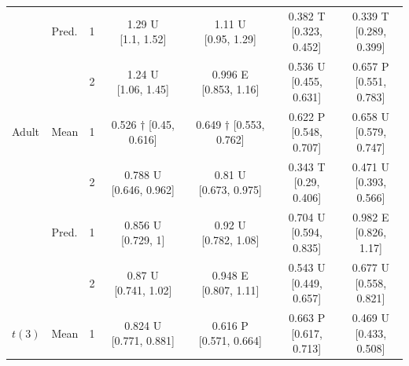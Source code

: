 \begin{tabular}{llccccc}
 & Pred. & 1 & \shortstack{1.29 U \\{} [1.1, 1.52]} & \shortstack{1.11 U \\{} [0.95, 1.29]} & \shortstack{0.382 T \\{} [0.323, 0.452]} & \shortstack{0.339 T \\{} [0.289, 0.399]} \\[2pt]
 &  & 2 & \shortstack{1.24 U \\{} [1.06, 1.45]} & \shortstack{0.996 E \\{} [0.853, 1.16]} & \shortstack{0.536 U \\{} [0.455, 0.631]} & \shortstack{0.657 P \\{} [0.551, 0.783]} \\[2pt]
\addlinespace
Adult & Mean & 1 & \shortstack{0.526 $\dagger$ \\{} [0.45, 0.616]} & \shortstack{0.649 $\dagger$ \\{} [0.553, 0.762]} & \shortstack{0.622 P \\{} [0.548, 0.707]} & \shortstack{0.658 U \\{} [0.579, 0.747]} \\[2pt]
 &  & 2 & \shortstack{0.788 U \\{} [0.646, 0.962]} & \shortstack{0.81 U \\{} [0.673, 0.975]} & \shortstack{0.343 T \\{} [0.29, 0.406]} & \shortstack{0.471 U \\{} [0.393, 0.566]} \\[2pt]
 & Pred. & 1 & \shortstack{0.856 U \\{} [0.729, 1]} & \shortstack{0.92 U \\{} [0.782, 1.08]} & \shortstack{0.704 U \\{} [0.594, 0.835]} & \shortstack{0.982 E \\{} [0.826, 1.17]} \\[2pt]
 &  & 2 & \shortstack{0.87 U \\{} [0.741, 1.02]} & \shortstack{0.948 E \\{} [0.807, 1.11]} & \shortstack{0.543 U \\{} [0.449, 0.657]} & \shortstack{0.677 U \\{} [0.558, 0.821]} \\[2pt]
\addlinespace
$t(3)$ & Mean & 1 & \shortstack{0.824 U \\{} [0.771, 0.881]} & \shortstack{0.616 P \\{} [0.571, 0.664]} & \shortstack{0.663 P \\{} [0.617, 0.713]} & \shortstack{0.469 U \\{} [0.433, 0.508]} \\[2pt]

\end{tabular}

